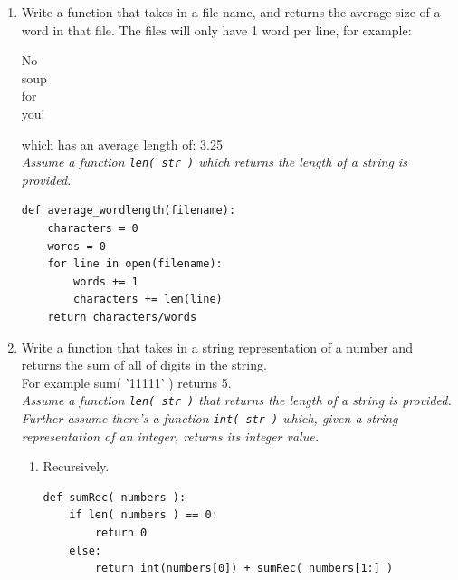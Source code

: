\documentclass[11pt]{article}
\newenvironment{answer}{\large\lstset{basicstyle=\tiny}\color{white}}{}
\newenvironment{answer}{\large\lstset{basicstyle=\large}\color{red}}{}
\begin{document}
\begin{enumerate}
\begin{enumerate}
    \end{enumerate}

\vfill
\pagebreak

    \item Write a function that takes in a file name, and returns the average
        size of a word in that file. The files will only have 1 word per line,
        for example:

        \begin{center}
        No\\
        soup\\
        for\\
        you!
        \end{center}

        which has an average length of: 3.25 \\ \emph{Assume a function \texttt{len( str )} which returns the length of a string is provided.}


\begin{answer}
\begin{lstlisting}
def average_wordlength(filename):
    characters = 0
    words = 0
    for line in open(filename):
        words += 1
        characters += len(line)
    return characters/words
\end{lstlisting}
\end{answer}

    \item Write a function that takes in a string representation of a number and returns the sum
        of all of digits in the string. \\For example sum( '11111' ) returns 5. \\
        \emph{Assume a function \texttt{len( str )} that returns the length of a string is provided. \\
         Further assume there's a function \texttt{int( str )} which, given a string representation of an integer, returns its integer value.}

        \begin{enumerate}
            \item Recursively.
\begin{answer}
\begin{lstlisting}
def sumRec( numbers ):
    if len( numbers ) == 0:
        return 0
    else:
        return int(numbers[0]) + sumRec( numbers[1:] )
\end{lstlisting}
\end{answer}


\end{enumerate}
\end{enumerate}
\end{document}

